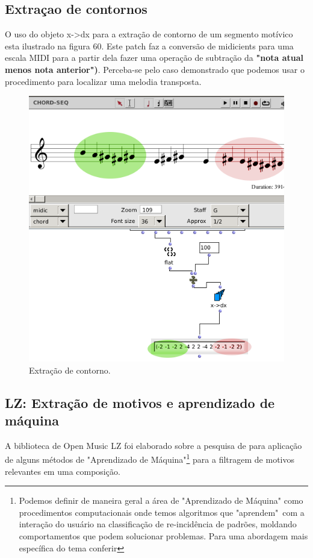 \documentclass[
	12pt,				%
	openright,			%
	twoside,			%
	a4paper,			%
	english,			%
	french,				%
	spanish,			%
	brazil				%
	]{abntex2}
\begin{document}
\subsection{Extraçao de contornos}

O uso do objeto x->dx para a extração de contorno de um segmento motívico esta ilustrado na figura 60. Este patch faz a conversão de midicients para uma escala MIDI para a partir dela fazer uma operação de subtração da \textbf{"nota atual menos nota anterior")}. Perceba-se pelo caso demonstrado que podemos usar o procedimento para localizar uma melodia transposta. 

\begin{figure}[!h]
	\caption{\label{fig_grafico}Extração de contorno. }
	\begin{center}
	    \includegraphics[scale=0.55]{OM_settheory/x_dx.png}
	\end{center}
\end{figure}


\subsection{LZ: Extração de motivos e aprendizado de máquina}	
\label{lz}

A biblioteca de Open Music LZ foi elaborado sobre a pesquisa de  para aplicação de alguns métodos de "Aprendizado de Máquina"\footnote{Podemos definir de maneira geral a área de "Aprendizado de Máquina" como procedimentos computacionais onde temos algoritmos que "aprendem"\ com a interação do usuário na classificação de re-incidência de padrões, moldando comportamentos que podem solucionar problemas. Para uma abordagem mais específica do tema conferir } para a filtragem de motivos relevantes em uma composição.
\end{document}
